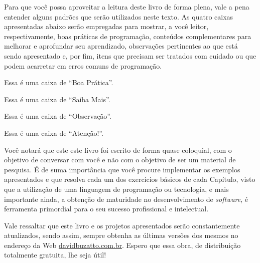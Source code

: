 Para que você possa aproveitar a leitura deste livro de forma plena, vale a pena entender alguns padrões que serão utilizados neste texto. As quatro caixas apresentadas abaixo serão empregadas para mostrar, a você leitor, respectivamente, boas práticas de programação, conteúdos complementares para melhorar e aprofundar seu aprendizado, observações pertinentes ao que está sendo apresentado e, por fim, itens que precisam ser tratados com cuidado ou que podem acarretar em erros comuns de programação.

\begin{boaPratica}
    Essa é uma caixa de ``Boa Prática''.
\end{boaPratica}

\begin{saibaMais}
    Essa é uma caixa de ``Saiba Mais''.
\end{saibaMais}

\begin{observacao}
    Essa é uma caixa de ``Observação''.
\end{observacao}

\begin{atencao}
    Essa é uma caixa de ``Atenção!''.
\end{atencao}

Você notará que este este livro foi escrito de forma quase coloquial, com o objetivo de conversar com você e não com o objetivo de ser um material de pesquisa. É de suma importância que você procure implementar os exemplos apresentados e que resolva cada um dos exercícios básicos de cada Capítulo, visto que a utilização de uma linguagem de programação ou tecnologia, e mais importante ainda, a obtenção de maturidade no desenvolvimento de \textit{software}, é ferramenta primordial para o seu sucesso profissional e intelectual.

Vale ressaltar que este livro e os projetos apresentados serão constantemente atualizados, sendo assim, sempre obtenha as últimas versões dos mesmos no endereço da Web \textcolor{corTema}{\href{http://davidbuzatto.com.br}{davidbuzatto.com.br}}. Espero que essa obra, de distribuição totalmente gratuita, lhe seja útil!
    

\vspace*{\fill}
